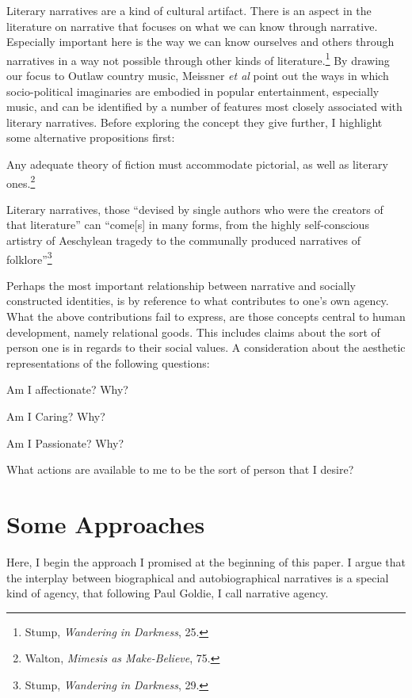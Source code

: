 \documentclass[phdthesis,12pt,final]{wuthesis}
\theoremstyle{definition}
\theoremstyle{definition}
\theoremstyle{definition}
\theoremstyle{definition}
\theoremstyle{remark}
\begin{document}
Literary narratives are a kind of cultural artifact. There is an aspect in the literature on narrative that focuses on what we can know through narrative. Especially important here is the way we can know ourselves and others through narratives in a way not possible through other kinds of literature.\footnote{Stump, \emph{Wandering in {Darkness}}, 25.} By drawing our focus to Outlaw country music, Meissner \emph{et al} point out the ways in which socio-political imaginaries are embodied in popular entertainment, especially music, and can be identified by a number of features most closely associated with literary narratives. Before exploring the concept they give further, I highlight some alternative propositions first:

Any adequate theory of fiction must accommodate pictorial, as well as literary ones.\footnote{Walton, \emph{Mimesis as {Make-Believe}}, 75.}

Literary narratives, those ``devised by single authors who were the creators of that literature'' can ``come{[}s{]} in many forms, from the highly self-conscious artistry of Aeschylean tragedy to the communally produced narratives of folklore''\footnote{Stump, \emph{Wandering in {Darkness}}, 29.}

Perhaps the most important relationship between narrative and socially constructed identities, is by reference to what contributes to one's own agency. What the above contributions fail to express, are those concepts central to human development, namely relational goods. This includes claims about the sort of person one is in regards to their social values. A consideration about the aesthetic representations of the following questions:

Am I affectionate? Why?

Am I Caring? Why?

Am I Passionate? Why?

What actions are available to me to be the sort of person that I desire?

\section{Some Approaches}\label{some-approaches}

Here, I begin the approach I promised at the beginning of this paper. I argue that the interplay between biographical and autobiographical narratives is a special kind of agency, that following Paul Goldie, I call narrative agency.
\end{document}
